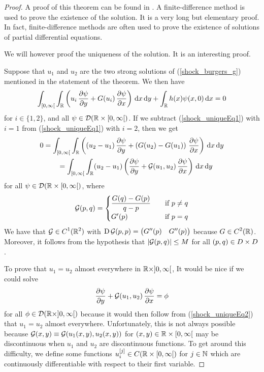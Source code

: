 \begin{proof}
A proof of this theorem can be found in \cite{Smo}.  A
finite-difference method is used to prove the existence of the solution.
It is a very long but elementary proof.  In fact, finite-difference
methods are often used to prove the existence of solutions of partial
differential equations.

We will however proof the uniqueness of the solution.  It is an
interesting proof.

Suppose that $u_1$ and $u_2$ are the two strong solutions of
(\ref{shock_burgers_g}) mentioned in the statement of the theorem.  We
then have
\begin{equation} \label{shock_uniqueEq1}
\int_{[0,\infty[} \int_{\mathbb{R}}
\left(u_i\,\frac{\partial{\psi}}{\partial y} + G(u_i)\,\frac{\partial{\psi}}{\partial x} \right) \,\mathrm{d}{x}\,\mathrm{d}{y}
+ \int_{\mathbb{R}} h(x) \psi(x,0) \,\mathrm{d}{x} = 0
\end{equation}
for $i \in \{1,2\}$, and all $\psi \in \mathcal{D}(\mathbb{R}\times [0,\infty[)$.
If we subtract (\ref{shock_uniqueEq1}) with $i=1$
from (\ref{shock_uniqueEq1}) with $i=2$, then we get
\begin{equation} \label{shock_uniqueEq2}
\begin{split}
0&= \int_{[0,\infty[} \int_{\mathbb{R}}
\left((u_2-u_1)\,\frac{\partial{\psi}}{\partial y} + \left(G(u_2)-G(u_1)\right)\,
\frac{\partial{\psi}}{\partial x} \right) \,\mathrm{d}{x}\,\mathrm{d}{y} \\
&\qquad =\int_{[0,\infty[} \int_{\mathbb{R}}
(u_2-u_1)\left( \frac{\partial{\psi}}{\partial y} + {\cal G}(u_1,u_2)\,\frac{\partial{\psi}}{\partial x} \right)
\,\mathrm{d}{x}\,\mathrm{d}{y}
\end{split}
\end{equation}
for all $\psi \in \mathcal{D}(\mathbb{R}\times [0,\infty[)$, where
\[
{\cal G}(p,q) =
\begin{cases}
\displaystyle \frac{G(q)-G(p)}{q-p} & \quad \text{if} \ p \neq q \\
G'(p) & \quad \text{if} \ p = q
\end{cases}
\]
We have that $\displaystyle {\cal G} \in C^1(\mathbb{R}^2)$ with
$\displaystyle \operatorname{D} {\cal G}(p,p) =
\begin{pmatrix} G''(p) & G''(p)\end{pmatrix}$ because
$\displaystyle G \in C^2(\mathbb{R})$.
Moreover, it follows from the hypothesis that
$|{\cal G}(p,q)| \leq M$ for all
$\displaystyle (p,q) \in D \times D$.

To prove that $u_1 = u_2$ almost everywhere in
$\mathbb{R}\times ]0,\infty[$,  It would be nice if we could solve 
\[
\frac{\partial{\psi}}{\partial y} + {\cal G}(u_1,u_2)\,\frac{\partial{\psi}}{\partial x} = \phi
\]
for all $\phi \in \mathcal{D}(\mathbb{R}\times ]0,\infty[)$ because it would
then follow from (\ref{shock_uniqueEq2}) that $u_1 = u_2$ almost
everywhere.  Unfortunately, this is not always possible because
${\cal G}(x,y) \equiv {\cal G}(u_1(x,y),u_2(x,y))$ for
$(x,y) \in \mathbb{R} \times [0,\infty[$ may be discontinuous when
$u_1$ and $u_2$ are discontinuous functions.  To get around
this difficulty, we define some functions
$\displaystyle u_i^{[j]}\in C(\mathbb{R}\times [0,\infty[)$ for
$j \in \mathbb{N}$ which are continuously differentiable with respect to
their first variable.


\end{proof}
